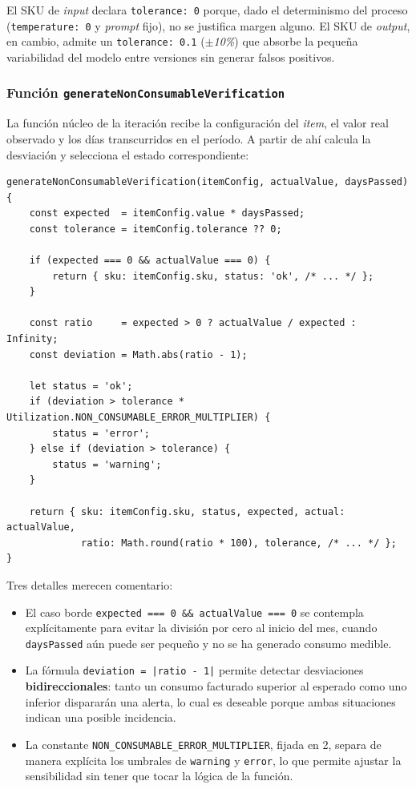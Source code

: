 El SKU de \textit{input} declara \texttt{tolerance: 0} porque, dado el determinismo del proceso (\texttt{temperature: 0} y \textit{prompt} fijo), no se justifica margen alguno. El SKU de \textit{output}, en cambio, admite un \texttt{tolerance: 0.1} (\textit{$\pm$10\%}) que absorbe la pequeña variabilidad del modelo entre versiones sin generar falsos positivos.

\subsubsection{Función \texttt{generateNonConsumableVerification}}

La función núcleo de la iteración recibe la configuración del \textit{item}, el valor real observado y los días transcurridos en el período. A partir de ahí calcula la desviación y selecciona el estado correspondiente:

\begin{lstlisting}[caption=Verificación de items no continuables, label=lst:non-consumable]
generateNonConsumableVerification(itemConfig, actualValue, daysPassed) {
    const expected  = itemConfig.value * daysPassed;
    const tolerance = itemConfig.tolerance ?? 0;

    if (expected === 0 && actualValue === 0) {
        return { sku: itemConfig.sku, status: 'ok', /* ... */ };
    }

    const ratio     = expected > 0 ? actualValue / expected : Infinity;
    const deviation = Math.abs(ratio - 1);

    let status = 'ok';
    if (deviation > tolerance * Utilization.NON_CONSUMABLE_ERROR_MULTIPLIER) {
        status = 'error';
    } else if (deviation > tolerance) {
        status = 'warning';
    }

    return { sku: itemConfig.sku, status, expected, actual: actualValue,
             ratio: Math.round(ratio * 100), tolerance, /* ... */ };
}
\end{lstlisting}

Tres detalles merecen comentario:

\begin{itemize}
    \item El caso borde \texttt{expected === 0 \&\& actualValue === 0} se contempla explícitamente para evitar la división por cero al inicio del mes, cuando \texttt{daysPassed} aún puede ser pequeño y no se ha generado consumo medible.
    \item La fórmula \texttt{deviation = |ratio - 1|} permite detectar desviaciones \textbf{bidireccionales}: tanto un consumo facturado superior al esperado como uno inferior dispararán una alerta, lo cual es deseable porque ambas situaciones indican una posible incidencia.
    \item La constante \texttt{NON\_CONSUMABLE\_ERROR\_MULTIPLIER}, fijada en 2, separa de manera explícita los umbrales de \texttt{warning} y \texttt{error}, lo que permite ajustar la sensibilidad sin tener que tocar la lógica de la función.
\end{itemize}

